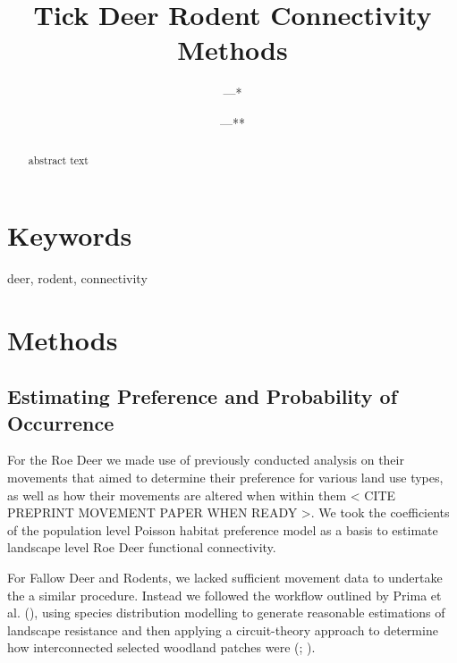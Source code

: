 \documentclass[10pt,a4paper]{article}
\begin{document}
\pagestyle{fancy}

\title{Tick Deer Rodent Connectivity Methods}
\author[1]{---*}
\author[2]{---**}
\author[3]{}
\author[4]{}
\author[3]{}
\author[5]{}
\author[6]{}
\author[7]{}
\author[1]{}
\affil[1]{---}
\affil[2]{---}
\affil[3]{}
\affil[4]{}
\affil[5]{}
\affil[6]{}
\affil[7]{}
\affil[*]{---}
\affil[**]{---}

\maketitle
\thispagestyle{fancy}

\begin{abstract}

abstract text

\end{abstract}

\section*{Keywords}

deer, rodent, connectivity

\clearpage
\pagestyle{fancy}

\section{Methods}\label{methods}

\subsection{Estimating Preference and Probability of Occurrence}\label{estimating-preference-and-probability-of-occurrence}

For the Roe Deer we made use of previously conducted analysis on their movements that aimed to determine their preference for various land use types, as well as how their movements are altered when within them \textless{} CITE PREPRINT MOVEMENT PAPER WHEN READY \textgreater.
We took the coefficients of the population level Poisson habitat preference model as a basis to estimate landscape level Roe Deer functional connectivity.

For Fallow Deer and Rodents, we lacked sufficient movement data to undertake the a similar procedure.
Instead we followed the workflow outlined by Prima et al. (), using species distribution modelling to generate reasonable estimations of landscape resistance and then applying a circuit-theory approach to determine how interconnected selected woodland patches were (; ).
\end{document}

